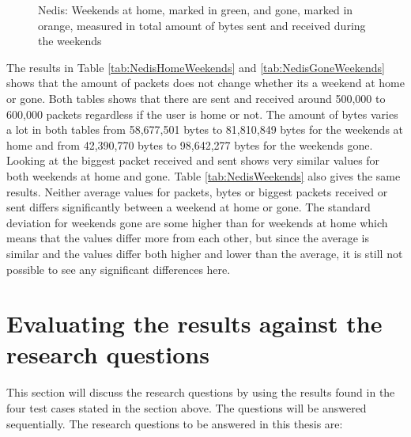 \begin{figure}[H]
    \begin{subfigure}[b]{0.47\textwidth}
    \end{subfigure}
    \begin{subfigure}[b]{0.47\textwidth}
    \end{subfigure}
   \begin{subfigure}[b]{0.47\textwidth}
    \end{subfigure}
    \hspace{0.6cm}
    \begin{subfigure}[b]{0.47\textwidth}
    \end{subfigure}
  \caption{Nedis: Weekends at home, marked in green, and gone, marked in orange, measured in total amount of bytes sent and received during the weekends}    \label{fig:NedisWeekendBytes}
\end{figure}

The results in Table \ref{tab:NedisHomeWeekends} and \ref{tab:NedisGoneWeekends} shows that the amount of packets does not change whether its a weekend at home or gone. Both tables shows that there are sent and received around 500,000 to 600,000 packets regardless if the user is home or not. The amount of bytes varies a lot in both tables from 58,677,501 bytes to 81,810,849 bytes for the weekends at home and from 42,390,770 bytes to 98,642,277 bytes for the weekends gone. Looking at the biggest packet received and sent shows very similar values for both weekends at home and gone. Table \ref{tab:NedisWeekends} also gives the same results. Neither average values for packets, bytes or biggest packets received or sent differs significantly between a weekend at home or gone. The standard deviation for weekends gone are some higher than for weekends at home which means that the values differ more from each other, but since the average is similar and the values differ both higher and lower than the average, it is still not possible to see any significant differences here. 

\section{Evaluating the results against the research questions}
This section will discuss the research questions by using the results found in the four test cases stated in the section above. The questions will be answered sequentially. The research questions to be answered in this thesis are:

